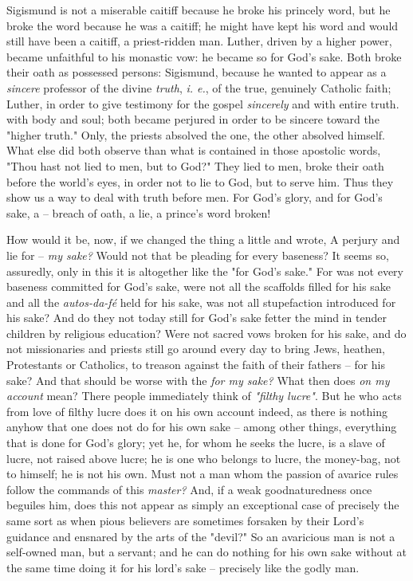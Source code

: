 \documentclass[a4paper]{book}
\begin{document}
Sigismund is not a miserable caitiff because he broke his princely word, but 
he broke the word because he was a caitiff; he might have kept his word and 
would still have been a caitiff, a priest-ridden man. Luther, driven by a 
higher power, became unfaithful to his monastic vow: he became so for God's 
sake. Both broke their oath as possessed persons: Sigismund, because he wanted 
to appear as a \textit{sincere} professor of the divine \textit{truth}, 
\textit{i. e.}, of the true, genuinely Catholic faith; Luther, in order to 
give testimony for the gospel \textit{sincerely} and with entire truth. with 
body and soul; both became perjured in order to be sincere toward the 
"{}higher truth."{} Only, the priests absolved the one, the other absolved 
himself. What else did both observe than what is contained in those apostolic 
words, "{}Thou hast not lied to men, but to God?"{} They lied to men, broke 
their oath before the world's eyes, in order not to lie to God, but to serve 
him. Thus they show us a way to deal with truth before men. For God's glory, 
and for God's sake, a -- breach of oath, a lie, a prince's word broken!

How would it be, now, if we changed the thing a little and wrote, A perjury 
and lie for -- \textit{my sake?} Would not that be pleading for every 
baseness? It seems so, assuredly, only in this it is altogether like the 
"{}for God's sake."{} For was not every baseness committed for God's sake, 
were not all the scaffolds filled for his sake and all the 
\textit{autos-da-f\'e} held for his sake, was not all stupefaction introduced 
for his sake? And do they not today still for God's sake fetter the mind in 
tender children by religious education? Were not sacred vows broken for his 
sake, and do not missionaries and priests still go around every day to bring 
Jews, heathen, Protestants or Catholics, to treason against the faith of their 
fathers -- for his sake? And that should be worse with the \textit{for my 
sake?} What then does \textit{on my account} mean? There people immediately 
think of \textit{"{}filthy lucre"{}}. But he who acts from love of filthy 
lucre does it on his own account indeed, as there is nothing anyhow that one 
does not do for his own sake -- among other things, everything that is done 
for God's glory; yet he, for whom he seeks the lucre, is a slave of lucre, not 
raised above lucre; he is one who belongs to lucre, the money-bag, not to 
himself; he is not his own. Must not a man whom the passion of avarice rules 
follow the commands of this \textit{master?} And, if a weak goodnaturedness 
once beguiles him, does this not appear as simply an exceptional case of 
precisely the same sort as when pious believers are sometimes forsaken by 
their Lord's guidance and ensnared by the arts of the "{}devil?"{} So an 
avaricious man is not a self-owned man, but a servant; and he can do nothing 
for his own sake without at the same time doing it for his lord's sake -- 
precisely like the godly man.
\end{document}

